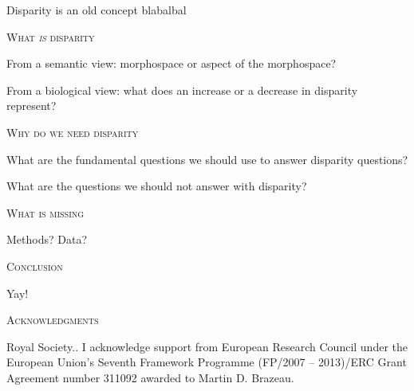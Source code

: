 \documentclass[12pt,letterpaper]{article}
\renewcommand{\section}[1]{%
\bigskip
\begin{center}
\begin{Large}
\normalfont\scshape #1
\medskip
\end{Large}
\end{center}}
\begin{document}
Disparity is an old concept blabalbal

\section{What \textit{is} disparity}

From a semantic view: morphospace or aspect of the morphospace?

From a biological view: what does an increase or a decrease in disparity represent?

\section{Why do we need disparity}

What are the fundamental questions we should use to answer disparity questions?

What are the questions we should not answer with disparity?

\section{What is missing}

Methods?
Data?

\section{Conclusion}

Yay!


\section{Acknowledgments}
Royal Society..
I acknowledge support from European Research Council under the European Union's Seventh Framework Programme (FP/2007 – 2013)/ERC Grant Agreement number 311092 awarded to Martin D. Brazeau.




\end{document}
